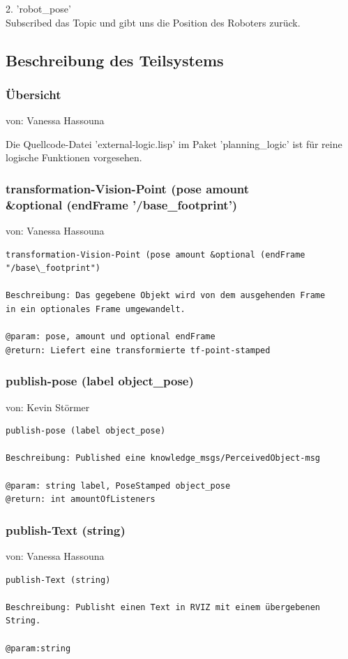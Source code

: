 \documentclass{suturo}
\makeatletter
\newcommand{\chapterauthor}[1]{%
  {\parindent0pt\vspace*{-27pt}%
  \linespread{0}\small\begin{flushright}von: #1\end{flushright}%
  \par\nobreak\vspace*{0pt}}
  \@afterheading%
}
\makeatother
\begin{document}
2. 'robot\_pose' \\
Subscribed das Topic und gibt uns die Position des Roboters zurück.
\subsection{Beschreibung des Teilsystems}

\subsubsection{\"Ubersicht}
\chapterauthor{Vanessa Hassouna}
Die Quellcode-Datei 'external-logic.lisp' im Paket 'planning\_logic' ist für reine logische Funktionen vorgesehen.



\subsubsection{transformation-Vision-Point (pose amount\\
\&optional (endFrame '/base\_footprint')}
\chapterauthor{Vanessa Hassouna}
\begin{verbatim}
transformation-Vision-Point (pose amount &optional (endFrame "/base\_footprint")

Beschreibung: Das gegebene Objekt wird von dem ausgehenden Frame
in ein optionales Frame umgewandelt.

@param: pose, amount und optional endFrame
@return: Liefert eine transformierte tf-point-stamped
\end{verbatim}


\subsubsection{publish-pose (label object\_pose)}
\chapterauthor{Kevin Störmer}
\begin{verbatim}
publish-pose (label object_pose)

Beschreibung: Published eine knowledge_msgs/PerceivedObject-msg

@param: string label, PoseStamped object_pose
@return: int amountOfListeners
\end{verbatim}


\subsubsection{ publish-Text (string)}
\chapterauthor{Vanessa Hassouna}
\begin{verbatim}
publish-Text (string)

Beschreibung: Publisht einen Text in RVIZ mit einem übergebenen String.

@param:string
\end{verbatim}
\end{document}
